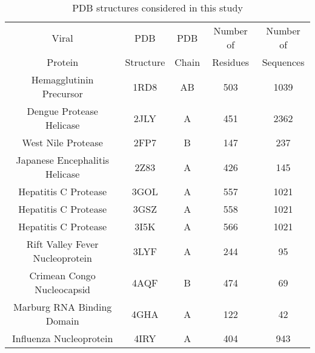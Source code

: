 \begin{table}[htbp]
	\begin{center}
		\caption{PDB structures considered in this study \label{tab:pdb_names}}
		\begin{tabular}{c c c c c} %
			\hline
			\hline
			Viral       					& PDB            & PDB       & Number of          & Number of 	\\ %
			Protein							& Structure      & Chain     & Residues           & Sequences 	\\ %
			\hline                                                                                          
			Hemagglutinin Precursor         & 1RD8           & AB        & 503                & 1039        \\ %
			Dengue Protease Helicase        & 2JLY           & A         & 451                & 2362        \\ %
			West Nile Protease              & 2FP7           & B         & 147                & 237         \\ %
			Japanese Encephalitis Helicase  & 2Z83           & A         & 426                & 145         \\ %
			Hepatitis C Protease            & 3GOL           & A         & 557                & 1021        \\ %
			Hepatitis C Protease            & 3GSZ           & A         & 558                & 1021        \\ %
			Hepatitis C Protease            & 3I5K           & A         & 566                & 1021        \\ %
			Rift Valley Fever Nucleoprotein & 3LYF           & A         & 244                & 95          \\ %
			Crimean Congo Nucleocapsid      & 4AQF           & B         & 474                & 69          \\ %
			Marburg RNA Binding Domain      & 4GHA           & A         & 122                & 42          \\ %
			Influenza Nucleoprotein         & 4IRY           & A         & 404                & 943         \\ %
			\hline
			\hline
		\end{tabular}
	\end{center}
\end{table}
